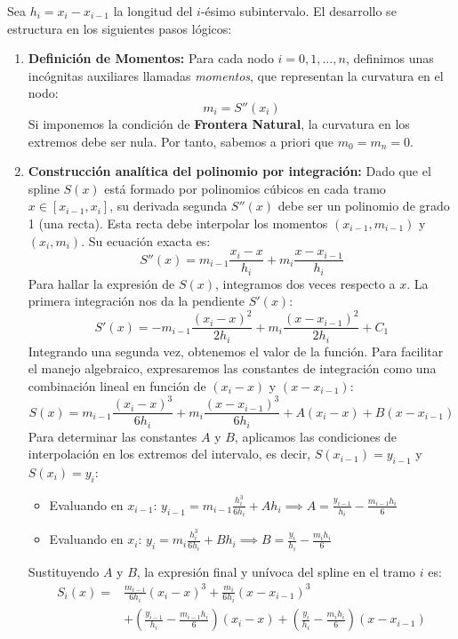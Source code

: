 Sea $h_i = x_i - x_{i-1}$ la longitud del $i$-ésimo subintervalo. El desarrollo se estructura en los siguientes pasos lógicos:

\begin{enumerate}
    \item \textbf{Definición de Momentos:} 
    Para cada nodo $i = 0, 1, \ldots, n$, definimos unas incógnitas auxiliares llamadas \textit{momentos}, que representan la curvatura en el nodo:
    \[
        m_i = S''(x_i)
    \]
    Si imponemos la condición de \textbf{Frontera Natural}, la curvatura en los extremos debe ser nula. Por tanto, sabemos a priori que $m_0 = m_n = 0$.

    \item \textbf{Construcción analítica del polinomio por integración:}
    Dado que el spline $S(x)$ está formado por polinomios cúbicos en cada tramo $x \in [x_{i-1}, x_i]$, su derivada segunda $S''(x)$ debe ser un polinomio de grado 1 (una recta). Esta recta debe interpolar los momentos $(x_{i-1}, m_{i-1})$ y $(x_i, m_i)$. Su ecuación exacta es:
    \[
        S''(x) = m_{i-1} \frac{x_i - x}{h_i} + m_i \frac{x - x_{i-1}}{h_i}
    \]
    Para hallar la expresión de $S(x)$, integramos dos veces respecto a $x$. La primera integración nos da la pendiente $S'(x)$:
    \[
        S'(x) = -m_{i-1} \frac{(x_i - x)^2}{2h_i} + m_i \frac{(x - x_{i-1})^2}{2h_i} + C_1
    \]
    Integrando una segunda vez, obtenemos el valor de la función. Para facilitar el manejo algebraico, expresaremos las constantes de integración como una combinación lineal en función de $(x_i - x)$ y $(x - x_{i-1})$:
    \[
        S(x) = m_{i-1} \frac{(x_i - x)^3}{6h_i} + m_i \frac{(x - x_{i-1})^3}{6h_i} + A (x_i - x) + B (x - x_{i-1})
    \]
    Para determinar las constantes $A$ y $B$, aplicamos las condiciones de interpolación en los extremos del intervalo, es decir, $S(x_{i-1}) = y_{i-1}$ y $S(x_i) = y_i$:
    \begin{itemize}
        \item Evaluando en $x_{i-1}$: \quad $y_{i-1} = m_{i-1} \frac{h_i^3}{6h_i} + A h_i \implies A = \frac{y_{i-1}}{h_i} - \frac{m_{i-1} h_i}{6}$
        \item Evaluando en $x_i$: \quad $y_i = m_i \frac{h_i^3}{6h_i} + B h_i \implies B = \frac{y_i}{h_i} - \frac{m_i h_i}{6}$
    \end{itemize}
    Sustituyendo $A$ y $B$, la expresión final y unívoca del spline en el tramo $i$ es:
    \begin{align}
        S_i(x) =& \frac{m_{i-1}}{6h_i} (x_i - x)^3 + \frac{m_i}{6h_i} (x - x_{i-1})^3 \nonumber \\
              &+ \left( \frac{y_{i-1}}{h_i} - \frac{m_{i-1} h_i}{6} \right) (x_i - x) 
               + \left( \frac{y_i}{h_i} - \frac{m_i h_i}{6} \right) (x - x_{i-1}) \label{eq:spline_tramo}
    \end{align}


\end{enumerate}
